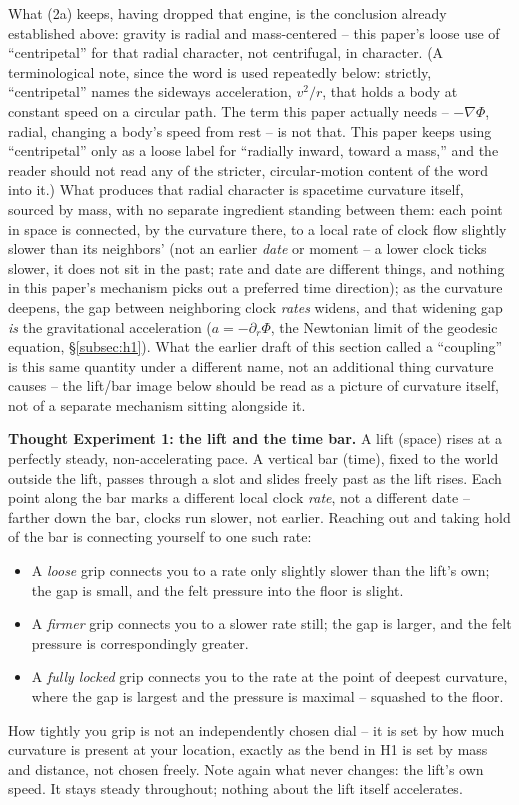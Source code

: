 \documentclass[12pt, a4paper]{article}
\begin{document}
What (2a) keeps, having dropped that engine, is the conclusion
already established above: gravity is radial and mass-centered --
this paper's loose use of ``centripetal'' for that radial character,
not centrifugal, in character. (A terminological note, since the
word is used repeatedly below: strictly, ``centripetal'' names the
sideways acceleration, $v^2/r$, that holds a body at constant speed
on a circular path. The term this paper actually needs -- $-\nabla\Phi$,
radial, changing a body's speed from rest -- is not that. This paper
keeps using ``centripetal'' only as a loose label for ``radially
inward, toward a mass,'' and the reader should not read any of the
stricter, circular-motion content of the word into it.) What
produces that radial character is spacetime curvature itself, sourced
by mass, with no separate ingredient standing between them: each
point in space is connected, by the curvature there, to a local rate
of clock flow slightly slower than its neighbors' (not an earlier
\emph{date} or moment -- a lower clock ticks slower, it does not sit
in the past; rate and date are different things, and nothing in this
paper's mechanism picks out a preferred time direction); as the
curvature deepens, the gap between neighboring clock \emph{rates}
widens, and that widening gap \emph{is} the gravitational acceleration
($a=-\partial_r\Phi$, the Newtonian limit of the geodesic equation,
\S\ref{subsec:h1}). What the earlier draft of this section called a
``coupling'' is this same quantity under a different name, not an
additional thing curvature causes -- the lift/bar image below should
be read as a picture of curvature itself, not of a separate mechanism
sitting alongside it.

\textbf{Thought Experiment 1: the lift and the time bar.} A lift (space) rises at
a perfectly steady, non-accelerating pace. A vertical bar (time),
fixed to the world outside the lift, passes through a slot and
slides freely past as the lift rises. Each point along the bar marks
a different local clock \emph{rate}, not a different date -- farther
down the bar, clocks run slower, not earlier. Reaching out and taking
hold of the bar is connecting yourself to one such rate:
\begin{itemize}
  \item A \emph{loose} grip connects you to a rate only slightly
    slower than the lift's own; the gap is small, and the felt
    pressure into the floor is slight.
  \item A \emph{firmer} grip connects you to a slower rate still;
    the gap is larger, and the felt pressure is correspondingly
    greater.
  \item A \emph{fully locked} grip connects you to the rate at the
    point of deepest curvature, where the gap is largest and the
    pressure is maximal -- squashed to the floor.
\end{itemize}
How tightly you grip is not an independently chosen dial -- it is set
by how much curvature is present at your location, exactly as the
bend in H1 is set by mass and distance, not chosen freely. Note again
what never changes: the lift's own speed. It stays steady throughout;
nothing about the lift itself accelerates.
\end{document}
